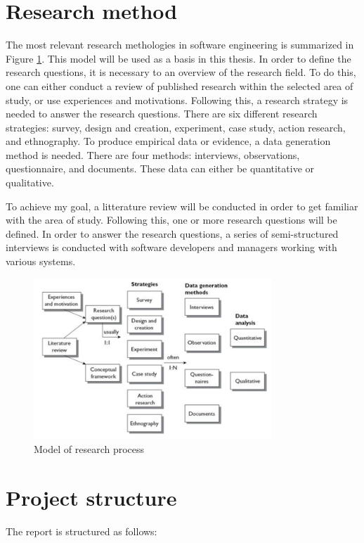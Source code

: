 \section{Research method}
The most relevant research methologies in software engineering is summarized in Figure \ref{fig:researchProcess}. This model will be used as a basis in this thesis. In order to define the research questions, it is necessary to an overview of the research field. To do this, one can either conduct a review of published research within the selected area of study, or use experiences and motivations. Following this, a research strategy is needed to answer the research questions. There are six different research strategies: survey, design and creation, experiment, case study, action research, and ethnography. To produce empirical data or evidence, a data generation method is needed. There are four methods: interviews, observations, questionnaire, and documents. These data can either be quantitative or qualitative. 

To achieve my goal, a litterature review will be conducted in order to get familiar with the area of study. Following this, one or more research questions will be defined. In order to answer the research questions, a series of semi-structured interviews is conducted with software developers and managers working with various systems. 

\begin{figure}
	\centering
	\includegraphics[width=0.8\textwidth]{images/researchStrategies.png}
	\caption{Model of research process\cite{Oates:2006:RIS:1202299}}
	\label{fig:researchProcess}
\end{figure}

\section{Project structure}
The report is structured as follows:

